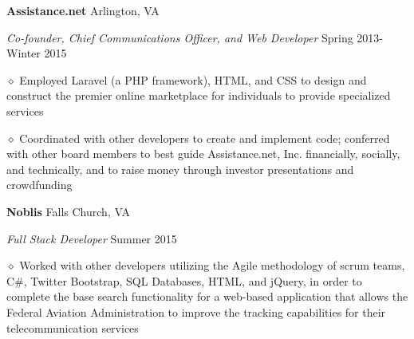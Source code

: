 \documentclass[executivepaper]{extarticle}
\begin{document}
\begin{center}
{\begin{minipage}{7.0in}
\vspace{2mm}

{\noindent \textbf{\fontsize{12}{8}\selectfont Assistance.net}} {\hfill \fontsize{10}{8}\selectfont Arlington, VA}

\vspace{1mm}

{\noindent \textit{\fontsize{12}{8}\selectfont Co-founder, Chief Communications Officer, and Web Developer}} {\hfill \fontsize{10}{8}\selectfont Spring 2013-Winter 2015}

\vspace{1mm}

{\noindent $\diamond$ {\fontsize{12}{8}\selectfont Employed Laravel (a PHP framework), HTML, and CSS to design and construct the premier online marketplace for individuals to provide specialized services}}

\vspace{1mm}

{\noindent $\diamond$ {\fontsize{12}{8}\selectfont Coordinated with other developers to create and implement code; conferred with other board members to best guide Assistance.net, Inc. financially, socially, and technically,
and to raise money through investor presentations and crowdfunding}}

\vspace{2mm}

{\noindent \textbf{\fontsize{12}{8}\selectfont Noblis}} {\hfill \fontsize{10}{8}\selectfont Falls Church, VA}

\vspace{1mm}

{\noindent \textit{\fontsize{12}{8}\selectfont Full Stack Developer}} {\hfill \fontsize{10}{8}\selectfont Summer 2015}

\vspace{1mm}

{\noindent $\diamond$ {\fontsize{12}{8}\selectfont Worked with other developers utilizing the Agile methodology of scrum teams, C\#, Twitter Bootstrap, SQL Databases, HTML, and jQuery, in order to complete
the base search functionality for a web-based application that allows the Federal Aviation Administration to improve the tracking capabilities for their telecommunication services}}

\vspace{3mm}



\end{minipage}}
\end{center}
\end{document}
